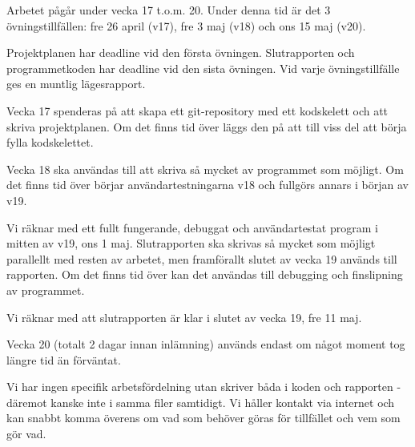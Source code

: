 Arbetet pågår under vecka 17 t.o.m. 20.
Under denna tid är det 3 övningstillfällen:
fre 26 april (v17),
fre 3 maj (v18) och
ons 15 maj (v20).

Projektplanen har deadline vid den första övningen.
Slutrapporten och programmetkoden har deadline vid den sista övningen.
Vid varje övningstillfälle ges en muntlig lägesrapport.

Vecka 17 spenderas på att skapa ett git-repository med ett kodskelett och
att skriva projektplanen.
Om det finns tid över läggs den på att till viss del att börja
fylla kodskelettet.

Vecka 18 ska användas till att skriva så mycket av programmet som möjligt.
Om det finns tid över börjar användartestningarna v18 och fullgörs annars
i början av v19.

Vi räknar med ett fullt fungerande, debuggat och användartestat
program i mitten av v19, ons 1 maj.
Slutrapporten ska skrivas så mycket som möjligt parallellt
med resten av arbetet,
men framförallt slutet av vecka 19 används till rapporten.
Om det finns tid över kan det användas till
debugging och finslipning av programmet.

Vi räknar med att slutrapporten är klar i slutet av vecka 19, fre 11 maj.

Vecka 20 (totalt 2 dagar innan inlämning) används endast om något
moment tog längre tid än förväntat.

Vi har ingen specifik arbetsfördelning utan skriver båda i koden och rapporten
- däremot kanske inte i samma filer samtidigt.
Vi håller kontakt via internet och kan snabbt komma överens om vad som
behöver göras för tillfället och vem som gör vad.

